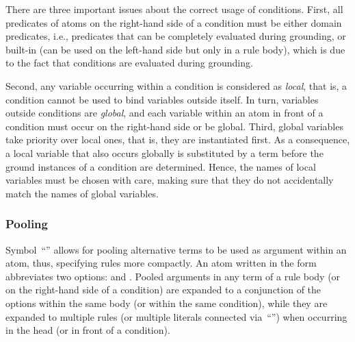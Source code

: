 There are three important issues about the correct usage of conditions.
First, all predicates of atoms on the right-hand side of a condition
must be either domain predicates,
i.e., predicates that can be completely evaluated during grounding,
or built-in (can be used on the left-hand side but only in a rule body),
which is due to the fact that conditions are evaluated during grounding.

Second, any variable occurring within a condition is considered as \emph{local},
that is, a condition cannot be used to bind variables outside itself.
In turn, variables outside conditions are \emph{global}, and each variable
within an atom in front of a condition must occur on the right-hand side or
be global.
Third, global variables take priority over local ones, that is,
they are instantiated first.
As a consequence, a local variable that also occurs globally is substituted by a term
before the ground instances of a condition are determined.
Hence, the names of local variables must be chosen with care,
making sure that they do not accidentally match the names of global variables.


\subsubsection{Pooling}\label{subsec:gringo:pool}

Symbol~``\code{;}'' allows for pooling alternative terms to be used as
argument within an atom, thus, specifying rules more compactly.
An atom written in the form 
abbreviates two options:
 and .
Pooled arguments in any term of a rule body 
(or on the right-hand side of a condition) are expanded to a conjunction
of the options within the same body (or within the same condition),
while they are expanded to multiple rules 
(or multiple literals connected via~``\code{,}'')
when occurring in the head (or in front of a condition).

